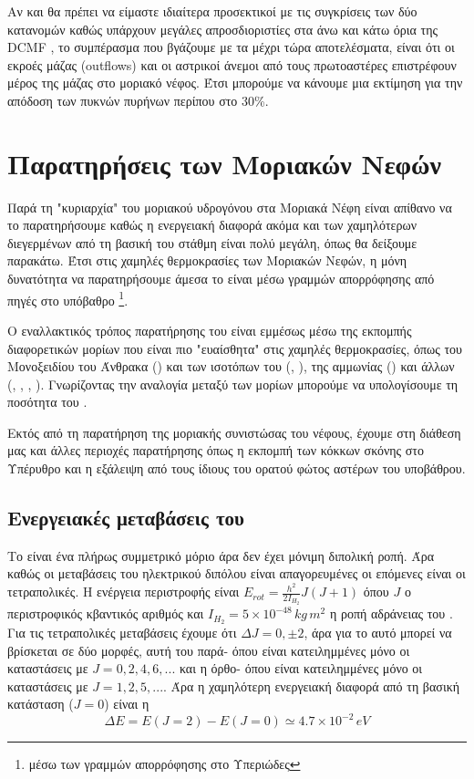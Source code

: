 \documentclass[a4paper,12pt]{memoir}
\begin{document}
Αν και θα πρέπει να είμαστε ιδιαίτερα προσεκτικοί με τις συγκρίσεις των δύο κατανομών καθώς υπάρχουν μεγάλες απροσδιοριστίες στα άνω και κάτω όρια της DCMF \cite{polychroni__2010}, το συμπέρασμα που βγάζουμε με τα μέχρι τώρα αποτελέσματα, είναι ότι οι εκροές μάζας (outflows) και οι αστρικοί άνεμοι από τους πρωτοαστέρες επιστρέφουν μέρος της μάζας στο μοριακό νέφος. Έτσι μπορούμε να κάνουμε μια εκτίμηση για την απόδοση των πυκνών πυρήνων περίπου στο 30\%.



\section{Παρατηρήσεις των Μοριακών Νεφών}
\label{par:H2}
Παρά τη "κυριαρχία" του μοριακού υδρογόνου στα Μοριακά Νέφη είναι απίθανο να το παρατηρήσουμε καθώς η ενεργειακή διαφορά ακόμα και των χαμηλότερων διεγερμένων από τη βασική του στάθμη είναι πολύ μεγάλη, όπως θα δείξουμε παρακάτω. Έτσι στις χαμηλές θερμοκρασίες των Μοριακών Νεφών, η μόνη δυνατότητα να παρατηρήσουμε άμεσα το  είναι μέσω γραμμών απορρόφησης από πηγές στο υπόβαθρο \footnote{μέσω των γραμμών απορρόφησης στο Υπεριώδες}. 

Ο εναλλακτικός τρόπος παρατήρησης του  είναι εμμέσως μέσω της εκπομπής διαφορετικών μορίων που είναι πιο "ευαίσθητα" στις χαμηλές θερμοκρασίες, όπως του Μονοξειδίου του Άνθρακα () και των ισοτόπων του (, ), της αμμωνίας () και άλλων (, , , ).
Γνωρίζοντας την αναλογία μεταξύ των μορίων μπορούμε να υπολογίσουμε τη ποσότητα του .

Εκτός από τη παρατήρηση της μοριακής συνιστώσας του νέφους, έχουμε στη διάθεση μας και άλλες περιοχές παρατήρησης όπως η εκπομπή των κόκκων σκόνης στο Υπέρυθρο και η εξάλειψη από τους ίδιους του ορατού φώτος αστέρων του υποβάθρου.

\subsection{Ενεργειακές μεταβάσεις του }
Το  είναι ένα πλήρως συμμετρικό μόριο άρα δεν έχει μόνιμη διπολική ροπή. Άρα καθώς οι μεταβάσεις του ηλεκτρικού διπόλου είναι απαγορευμένες οι επόμενες είναι οι τετραπολικές. 
Η ενέργεια περιστροφής είναι $E_{rot}=\frac{h^2}{2I_{H_2}}J(J+1)$ όπου $J$ ο περιστροφικός κβαντικός αριθμός και $I_{H_2}=5\times 10^{-48} \, kg\, m^2$ η ροπή αδράνειας του .
Για τις τετραπολικές μεταβάσεις έχουμε ότι $\Delta J =0,\pm 2$, άρα για το  αυτό μπορεί να βρίσκεται σε δύο μορφές, αυτή του παρά- όπου είναι κατειλημμένες μόνο οι καταστάσεις με $J=0,2,4,6,...$ και η όρθο- όπου είναι κατειλημμένες μόνο οι καταστάσεις με $J=1,2,5,...$. 
Άρα η χαμηλότερη ενεργειακή διαφορά από τη βασική κατάσταση ($J=0$) είναι η 
\begin{equation}
\Delta E=E(J=2)-E(J=0)\simeq 4.7\times 10^{-2}\, eV
\end{equation}
\end{document}
